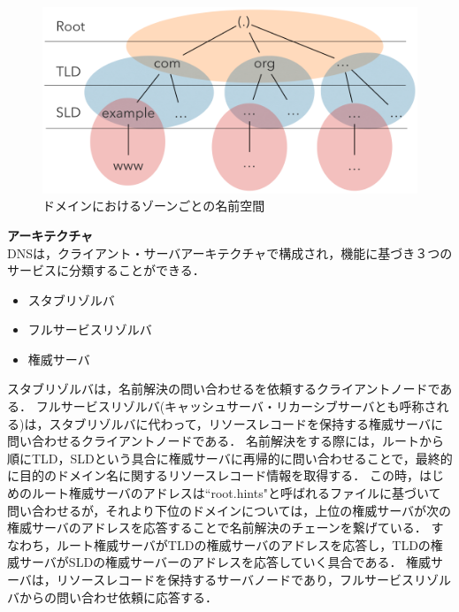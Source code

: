 \begin{figure}[h]
 \centering
 \includegraphics[width=12.0cm]{figure/dns-architecture.png}
 \caption{ドメインにおけるゾーンごとの名前空間}
 \label{fig:dns-architecture}
\end{figure}

\textbf{アーキテクチャ}\\
DNSは，クライアント・サーバアーキテクチャで構成され，機能に基づき３つのサービスに分類することができる．
\begin{itemize}
 \item スタブリゾルバ
 \vspace{-3mm}
 \item フルサービスリゾルバ
 \vspace{-3mm}
 \item 権威サーバ
\end{itemize}

スタブリゾルバは，名前解決の問い合わせるを依頼するクライアントノードである．
フルサービスリゾルバ(キャッシュサーバ・リカーシブサーバとも呼称される)は，スタブリゾルバに代わって，リソースレコードを保持する権威サーバに問い合わせるクライアントノードである．
名前解決をする際には，ルートから順にTLD，SLDという具合に権威サーバに再帰的に問い合わせることで，最終的に目的のドメイン名に関するリソースレコード情報を取得する．
この時，はじめのルート権威サーバのアドレスは``root.hints"と呼ばれるファイルに基づいて問い合わせるが，それより下位のドメインについては，上位の権威サーバが次の権威サーバのアドレスを応答することで名前解決のチェーンを繋げている．
すなわち，ルート権威サーバがTLDの権威サーバのアドレスを応答し，TLDの権威サーバがSLDの権威サーバーのアドレスを応答していく具合である．
権威サーバは，リソースレコードを保持するサーバノードであり，フルサービスリゾルバからの問い合わせ依頼に応答する．

